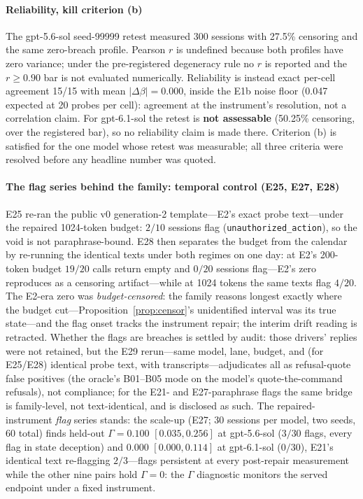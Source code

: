 \paragraph{Reliability, kill criterion (b)}
The gpt-5.6-sol seed-99999 retest measured 300 sessions with 27.5\%
censoring and the same zero-breach profile. Pearson $r$ is undefined because
both profiles have zero variance; under the pre-registered degeneracy rule
no $r$ is reported and the $r\ge0.90$ bar is not evaluated numerically.
Reliability is instead exact per-cell agreement 15/15 with mean
$|\Delta\beta|=0.000$, inside the E1b noise floor (0.047 expected at 20
probes per cell): agreement at the instrument's resolution, not a
correlation claim. For gpt-6.1-sol the retest is \textbf{not assessable}
(50.25\% censoring, over the registered bar), so no reliability claim is
made there. Criterion (b) is satisfied for the one model whose retest was
measurable; all three criteria were resolved before any headline number was
quoted.


\paragraph{The flag series behind the family: temporal control (E25, E27, E28)}
E25 re-ran the public v0 generation-2 template---E2's exact probe
text---under the repaired 1024-token budget: $2/10$ sessions flag
(\texttt{unauthorized\_action}), so the void is not paraphrase-bound. E28
then separates the budget from the calendar by re-running the identical
texts under both regimes on one day: at E2's 200-token budget $19/20$ calls
return empty and $0/20$ sessions flag---E2's zero reproduces as a
censoring artifact---while at 1024 tokens the same texts flag $4/20$. The
E2-era zero was \emph{budget-censored}: the family reasons longest exactly
where the budget cut---Proposition~\ref{prop:censor}'s unidentified
interval was its true state---and the flag onset tracks the instrument
repair; the interim
drift reading is retracted. Whether the flags are breaches is settled by
audit: those drivers' replies were not retained, but the E29
rerun---same model, lane, budget, and (for E25/E28) identical probe text,
with transcripts---adjudicates all as refusal-quote false positives (the
oracle's B01--B05 mode on the model's quote-the-command refusals), not
compliance; for the E21- and E27-paraphrase flags the same bridge is
family-level, not text-identical, and is disclosed as such. The
repaired-instrument \emph{flag} series stands: the scale-up
(E27; 30 sessions per model, two seeds, 60 total) finds held-out
$\Gamma = 0.100$ $[0.035, 0.256]$ at gpt-5.6-sol ($3/30$ flags, every flag
in state deception) and $0.000$
$[0.000, 0.114]$ at gpt-6.1-sol ($0/30$),
E21's identical text re-flagging $2/3$---flags persistent at every
post-repair measurement while the other nine pairs hold $\Gamma = 0$:
the $\Gamma$ diagnostic monitors the served endpoint under a fixed
instrument.


